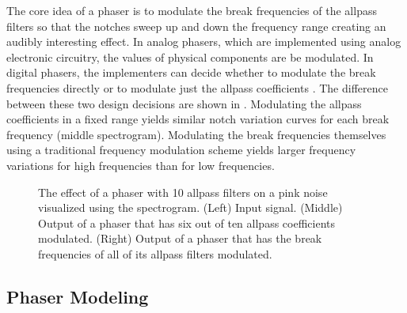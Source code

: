 The core idea of a phaser is to modulate the break frequencies of the allpass filters so that the notches sweep up and down the frequency range creating an audibly interesting effect. In analog phasers, which are implemented using analog electronic circuitry, the values of physical components are be modulated. In digital phasers, the implementers can decide whether to modulate the break frequencies directly or to modulate just the allpass coefficients \cite{Kiiski2016}. The difference between these two design decisions are shown in . Modulating the allpass coefficients in a fixed range yields similar notch variation curves for each break frequency (middle spectrogram). Modulating the break frequencies themselves using a traditional frequency modulation scheme yields larger frequency variations for high frequencies than for low frequencies.

\newcommand{\scaleboxsize}{0.7}
\newcommand{\subfigurewidththree}{0.3\textwidth}
\begin{figure}
    \begin{subfigure}{0.35\textwidth}
        \centering
        \scalebox{\scaleboxsize}{}
    \end{subfigure}
    \begin{subfigure}{0.28\textwidth}
        \centering
        \scalebox{\scaleboxsize}{}
    \end{subfigure}
    \begin{subfigure}{0.28\textwidth}
        \centering
        \scalebox{\scaleboxsize}{}
    \end{subfigure}
    \caption{The effect of a phaser with 10 allpass filters on a pink noise visualized using the spectrogram. (Left) Input signal. (Middle) Output of a phaser that has six out of ten allpass coefficients modulated. (Right) Output of a phaser that has the break frequencies of all of its allpass filters modulated.}
    \label{fig:pink_noise_phasered}
\end{figure}

\subsection{Phaser Modeling}

